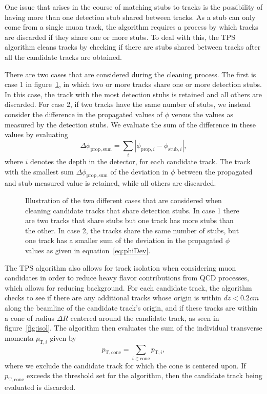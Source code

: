 One issue that arises in the course of matching stubs to tracks is the possibility of having more than one detection stub shared between tracks.
As a stub can only come from a single muon track, the algorithm requires a process by which tracks are discarded if they share one or more stubs.
To deal with this, the TPS algorithm cleans tracks by checking if there are stubs shared between tracks after all the candidate tracks are obtained.

There are two cases that are considered during the cleaning process.
The first is case 1 in figure~\ref{fig:clean}, in which two or more tracks share one or more detection stubs.
In this case, the track with the most detection stubs is retained and all others are discarded.
For case 2, if two tracks have the same number of stubs, we instead consider the difference in the propagated values of $\phi$ versus the values as measured by the detection stubs.
We evaluate the sum of the difference in these values by evaluating
\begin{equation}\label{eq:phiDev}
  \Delta\phi_{\mathrm{prop,sum}}=\sum_i|\phi_{\mathrm{prop},i}-\phi_{\mathrm{stub},i}|,
\end{equation}
where $i$ denotes the depth in the detector, for each candidate track.
The track with the smallest sum $\Delta\phi_{\mathrm{prop,sum}}$ of the deviation in $\phi$ between the propagated and stub measured value is retained, while all others are discarded.

\begin{figure}[htbp]
  \centering
  
  \caption{
    Illustration of the two different cases that are considered when cleaning candidate tracks that share detection stubs.
    In case 1 there are two tracks that share stubs but one track has more stubs than the other.
    In case 2, the tracks share the same number of stubs, but one track has a smaller sum of the deviation in the propagated $\phi$ values as given in equation~\ref{eq:phiDev}.
  }
  \label{fig:clean}
\end{figure}

The TPS algorithm also allows for track isolation when considering muon candidates in order to reduce heavy flavor contributions from QCD processes, which allows for reducing background.
For each candidate track, the algorithm checks to see if there are any additional tracks whose origin is within $dz<0.2\unit{cm}$ along the beamline of the candidate track's origin, and if these tracks are within a cone of radius $\Delta R$ centered around the candidate track, as seen in figure~\ref{fig:isol}.
The algorithm then evaluates the sum of the individual transverse momenta $p_{\mathrm{T},i}$ given by
\begin{equation}\label{eq:ptCone}
  p_\mathrm{T,cone}=\sum_{i\in\mathrm{cone}}p_{\mathrm{T},i},
\end{equation}
where we exclude the candidate track for which the cone is centered upon.
If $p_\mathrm{T,cone}$ exceeds the threshold set for the algorithm, then the candidate track being evaluated is discarded.


